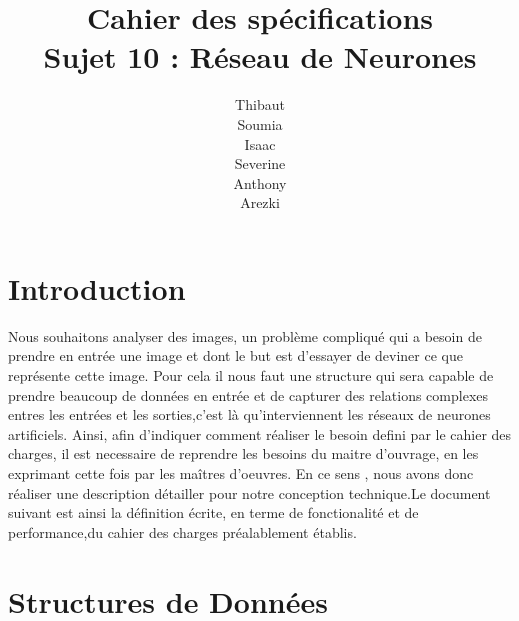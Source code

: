 \documentclass{article}
\begin{document}
\newpage
\title{Cahier des spécifications\\Sujet 10 : Réseau de Neurones}
\author{Thibaut \\Soumia {}\\Isaac {}\\Severine {}\\Anthony {}\\Arezki {}}
\maketitle

\newpage

\small{\tableofcontents}

\newpage
\section{Introduction}
 Nous souhaitons analyser des images, un problème compliqué qui a besoin de prendre en entrée une image et dont le but est d'essayer de deviner ce que représente cette image.
Pour cela il nous faut une structure qui sera capable de prendre beaucoup de données en entrée et de capturer des relations complexes entres les entrées et les sorties,c'est là qu'interviennent les réseaux de neurones artificiels.
Ainsi, afin d'indiquer comment réaliser le besoin defini par le cahier des charges, il est necessaire de reprendre les besoins du maitre d'ouvrage, en les exprimant cette fois par les maîtres d'oeuvres.
En ce sens , nous avons donc réaliser une description détailler pour notre conception technique.Le document suivant est ainsi la définition écrite, en terme de fonctionalité et de performance,du cahier des charges préalablement établis.

\section{Structures de Données}
\end{document}

